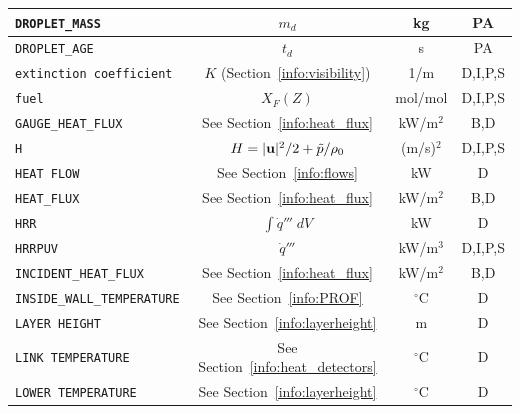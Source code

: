 \documentclass[11pt]{book}
\newcommand{\ct}{\tt\small}
\newcommand{\bu}{{\bf u}}
\newcommand{\tp}{\tilde{p}}
\newcommand{\dq}{\dot{q}}
\begin{document}
\begin{table}[h!]
\begin{center}
\begin{tabular}{|l|c|c|c|}
{\ct DROPLET\_MASS}                             & $m_d$                                         & kg             & PA           \\ \hline
{\ct DROPLET\_AGE}                              & $t_d$                                         & s              & PA           \\ \hline
{\ct extinction coefficient}                    & $K$ (Section~\ref{info:visibility})           & 1/m            & D,I,P,S      \\ \hline
{\ct fuel}                                      & $X_F(Z)$                                      & mol/mol        & D,I,P,S      \\ \hline
{\ct GAUGE\_HEAT\_FLUX}                         & See Section~\ref{info:heat_flux}              & kW/m$^2$       & B,D          \\ \hline
{\ct H}                                         & $H=|\bu|^2/2 + \tp/\rho_0$                    & (m/s)$^2$      & D,I,P,S      \\ \hline
{\ct HEAT FLOW}                                 & See Section~\ref{info:flows}                  & kW             & D            \\ \hline
{\ct HEAT\_FLUX}                                & See Section~\ref{info:heat_flux}              & kW/m$^2$       & B,D          \\ \hline
{\ct HRR}                                       & $\int \dq''' \; dV$                           & kW             & D            \\ \hline
{\ct HRRPUV}                                    & $\dq'''$                                      & kW/m$^3$       & D,I,P,S      \\ \hline
{\ct INCIDENT\_HEAT\_FLUX}                      & See Section~\ref{info:heat_flux}              & kW/m$^2$       & B,D          \\ \hline
{\ct INSIDE\_WALL\_TEMPERATURE}                 & See Section~\ref{info:PROF}                   & $^\circ$C      & D            \\ \hline
{\ct LAYER HEIGHT}                              & See Section~\ref{info:layerheight}            & m              & D            \\ \hline
{\ct LINK TEMPERATURE}                          & See Section~\ref{info:heat_detectors}         & $^\circ$C      & D            \\ \hline
{\ct LOWER TEMPERATURE}                         & See Section~\ref{info:layerheight}            & $^\circ$C      & D            \\ \hline
\end{tabular}
\end{center}
\end{table}
\end{document}
